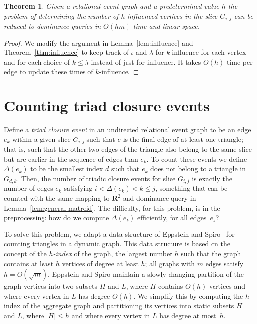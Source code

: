 \documentclass[11pt]{article}
\newcommand{\Real}{\mathbf{R}}
\newtheorem{theorem}{Theorem}
\begin{document}
\begin{theorem}
Given a relational event graph and a predetermined value $h$ the problem of determining the number of $h$-influenced vertices in the slice $G_{i,j}$ can be reduced to dominance queries in $O(hm)$ time and linear space.
\end{theorem}
\begin{proof}
We modify the argument in Lemma~\ref{lem:influence} and Theorem~\ref{thm:influence} to keep track of $\iota$ and $\lambda$ for $k$-influence for each vertex and for each choice of  $k\le h$ instead of just for influence. It takes $O(h)$ time per edge to update these times of $k$-influence.
\end{proof}

\section{Counting triad closure events}

Define a \emph{triad closure event} in an undirected relational event graph to be an edge $e_k$ within a given slice $G_{i,j}$ such that $e$ is the final edge of at least one triangle; that is, such that the other two edges of the triangle also belong to the same slice but are earlier in the sequence of edges than $e_k$.
To count these events we define $\Delta(e_k)$ to be the smallest index $d$ such that $e_k$ does not belong to a triangle in $G_{d,k}$. Then, the number of triadic closure events for slice $G_{i,j}$ is exactly the number of edges $e_k$ satisfying $i<\Delta(e_k)<k\le j$, something that can be counted with the same mapping to $\Real^2$ and dominance query in Lemma~\ref{lem:general-matroid}. The difficulty, for this problem, is in the preprocessing: how do we compute $\Delta(e_k)$ efficiently, for all edges~$e_k$?

To solve this problem, we adapt a data structure of Eppstein and Spiro~\cite{EppSpi-WADS-09} for counting triangles in a dynamic graph. This data structure is based on the concept of the \emph{$h$-index} of the graph, the largest number $h$ such that the graph contains at least $h$ vertices of degree at least $h$; all graphs with $m$ edges satisfy $h=O(\sqrt m)$.  Eppstein and Spiro maintain a slowly-changing partition of the graph vertices into two subsets $H$ and $L$, where $H$ contains $O(h)$ vertices and where every vertex in $L$ has degree $O(h)$. We simplify this by computing the $h$-index of the aggregate graph and partitioning its vertices into static subsets $H$ and $L$, where $|H|\le h$ and where every vertex in $L$ has degree at most~$h$.
\end{document}
